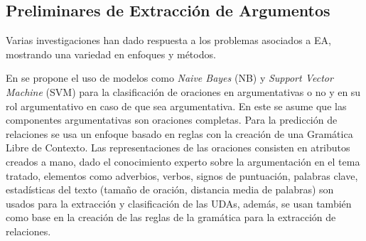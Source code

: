 \documentclass[a4paper,11pt,twocolumn,twoside]{article}
\begin{document}




\subsection{Preliminares de Extracción de Argumentos} %

Varias investigaciones han dado respuesta a los problemas asociados a EA, mostrando
una variedad en enfoques y métodos.

En \cite{palau2009argumentation} se propone
el uso de modelos como \textit{Naive Bayes} (NB) y \textit{Support Vector Machine} (SVM)
para la clasificación de 
oraciones en argumentativas o no y en su rol argumentativo en caso de que sea argumentativa. En este
se asume que las componentes argumentativas son oraciones completas. Para la predicción de relaciones
se usa un enfoque basado en reglas con la creación de una Gramática Libre de Contexto. Las representaciones
de las oraciones consisten en atributos creados a mano, dado el conocimiento experto sobre la argumentación
en el tema tratado, elementos como adverbios, verbos, signos de puntuación, palabras clave, estadísticas del texto
(tamaño de oración, distancia media de palabras) son usados para la extracción y clasificación de las UDAs, además,
se usan también como base en la creación de las reglas de la gramática para la extracción de relaciones.
\end{document}
